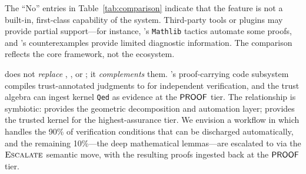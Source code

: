 \begin{remark}\label{rem:scope}
The ``No'' entries in Table~\ref{tab:comparison} indicate that the
feature is not a built-in, first-class capability of the system.
Third-party tools or plugins may provide partial support---for instance,
\LEAN{}'s \texttt{Mathlib} tactics automate some proofs, and \Dafny{}'s
counterexamples provide limited diagnostic information.  The comparison
reflects the core framework, not the ecosystem.
\end{remark}

\begin{remark}[Complementarity]\label{rem:complementarity}
\JuGeo{} does not \emph{replace} \LEAN{}, \Fstar{}, or \Coq{}; it
\emph{complements} them.  \JuGeo{}'s proof-carrying code subsystem
compiles trust-annotated judgments to \LEAN{} for independent
verification, and the trust algebra can ingest \LEAN{} kernel
\texttt{Qed} as evidence at the $\mathsf{PROOF}$ tier.  The relationship
is symbiotic: \JuGeo{} provides the geometric decomposition and
automation layer; \LEAN{} provides the trusted kernel for the
highest-assurance tier.  We envision a workflow in which \JuGeo{}
handles the 90\% of verification conditions that can be discharged
automatically, and the remaining 10\%---the deep mathematical
lemmas---are escalated to \LEAN{} via the $\textsc{Escalate}{}$ semantic move,
with the resulting proofs ingested back at the $\mathsf{PROOF}$ tier.
\end{remark}
